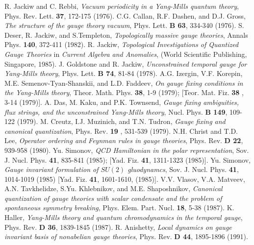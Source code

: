 \documentclass[a4paper,12pt]{article}
\begin{document}
\begin{thebibliography}{99}
%
R. Jackiw and C. Rebbi,
{\it Vacuum periodicity in a Yang-Mills quantum theory},
Phys. Rev. Lett. {\bf 37}, 172-175 (1976).
%
C.G. Callan, R.F. Dashen, and D.J. Gross,
{\it The structure of the gauge theory vacuum},
Phys. Lett. {\bf B 63}, 334-340 (1976).
%
S. Deser, R. Jackiw, and S.Templeton,
{\it Topologically massive gauge theories},
Annals Phys. {\bf 140}, 372-411 (1982).
%
R. Jackiw,
{\it Topological Investigations of Quantized Gauge Theories}
in {\it Current Algebra and Anomalies},
(World Scientific Publishing, Singapore, 1985).
%
J. Goldstone and R. Jackiw,
{\it Unconstrained temporal gauge for Yang-Mills theory},
Phys. Lett. {\bf B 74}, 81-84 (1978).
%
A.G. Izergin, V.F. Korepin, M.E. Semenov-Tyan-Shanskii, and L.D. Faddeev,
{\it On gauge fixing conditions in the Yang-Mills theory},
Theor. Math. Phys. {\bf 38}, 1-9 (1979);
[Teor. Mat. Fiz. {\bf 38 }, 3-14 (1979)].
%
A. Das, M. Kaku, and P.K. Townsend,
{\it Gauge fixing ambiguities, flux strings, and the unconstrained Yang-Mills
theory}, Nucl. Phys. {\bf B 149}, 109-122 (1979).
%
M. Creutz, I.J. Muzinich, and T.N. Tudron,
{\it Gauge fixing and canonical quantization},
Phys. Rev. {\bf 19 }, 531-539 (1979).
%
N.H. Christ and T.D. Lee,
{\it Operator ordering and Feynman rules in gauge theories},
Phys. Rev. {\bf D 22}, 939-958 (1980).
%
Yu. Simonov,
{\it QCD Hamiltonian in the polar representation},
Sov. J. Nucl. Phys. {\bf 41}, 835-841 (1985);
[Yad. Fiz. {\bf 41}, 1311-1323 (1985)].
%
Yu. Simonov,
{\it Gauge invariant formulation of $SU(2)$ gluodynamcs},
Sov. J. Nucl. Phys. {\bf 41}, 1014-1019 (1985)
[Yad. Fiz. {\bf 41}, 1601-1610, (1985)].
%
V.V. Vlasov, V.A. Matveev, A.N. Tavkhelidze, S.Yu. Khlebnikov,
and M.E. Shaposhnikov,
{\it Canonical quantization of gauge theories with scalar condensate and
the problem of spontaneous symmetry breaking},
Phys. Elem. Part. Nucl. {\bf 18}, 5-38 (1987).
%
K. Haller,
{\it Yang-Mills theory and quantum chromodynamics in the temporal gauge},
Phys. Rev. {\bf D 36}, 1839-1845 (1987).
%
R. Anishetty,
{\it Local dynamics on gauge invariant basis of nonabelian gauge theories},
Phys. Rev. {\bf D 44}, 1895-1896 (1991).
%

\end{thebibliography}
\end{document}
